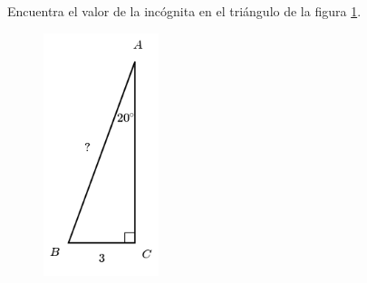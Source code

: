 Encuentra el valor de la incógnita en el triángulo de la figura \ref{fig:lados_functrig_09}.
\begin{figure}[H]
    \begin{center}
        \includegraphics[width=0.3\textwidth]{../images/lados_functrig_09.png}
    \end{center}
    \caption{}
    \label{fig:lados_functrig_09}
\end{figure}